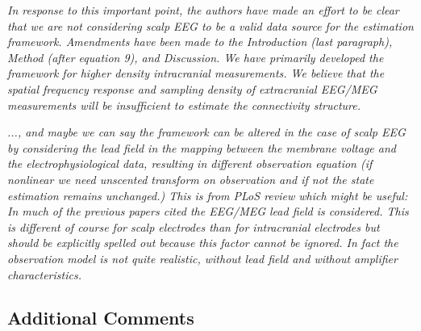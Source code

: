 \documentclass{article}
\begin{document}
\begin{enumerate}
	\emph{In response to this important point, the authors have made an effort to be clear that we are not considering scalp EEG to be a valid data source for the estimation framework. Amendments have been made to the Introduction (last paragraph), Method (after equation 9), and Discussion. We have primarily developed the framework for higher density intracranial measurements. We believe that the spatial frequency response and sampling density of extracranial EEG/MEG measurements will be insufficient to estimate the connectivity structure.}
	
	\emph{..., and maybe we can say the framework can be altered in the case of scalp EEG by considering the lead field in the mapping between the membrane voltage and the electrophysiological data, resulting in different observation equation (if nonlinear we need unscented transform on observation and if not the state estimation remains unchanged.) This is from PLoS review which might be useful: In much of the previous papers cited the EEG/MEG lead field is
considered. This is different of course for scalp electrodes than for intracranial electrodes but should be explicitly spelled out because this factor cannot be ignored. In fact the observation model is not quite realistic, without lead field and without amplifier characteristics.}
    \end{enumerate}
    
    \subsection{Additional Comments}
    
\end{document}
